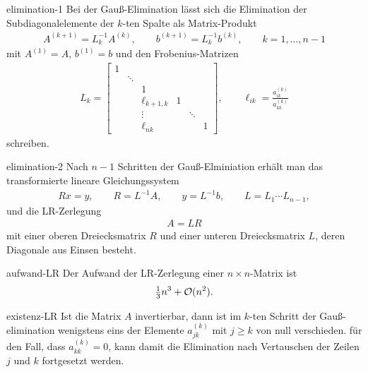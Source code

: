 \begin{Lemma}{elimination-1}
  Bei der Gauß-Elimination lässt sich die Elimination der
  Subdiagonalelemente der $k$-ten Spalte als Matrix-Produkt
  \begin{gather}
    A^{(k+1)} = L^{-1}_k A^{(k)},
    \qquad b^{(k+1)} = L^{-1}_k b^{(k)},
    \qquad k=1,\dots,n-1
  \end{gather}
  mit $A^{(1)}=A$, $b^{(1)}=b$ und den Frobenius-Matrizen
  \begin{gather}
    L_k =\begin{bmatrix}
      1 & & & & & \\
      &\ddots & & & & \\
      &   & 1& & &\\
      &   & \ell_{k+1,k}&1 & &\\
      &   & \vdots& &\ddots &\\
      &   & \ell_{nk}& & &1
    \end{bmatrix},
    \qquad
    \ell_{ik} = \frac{a_{ik}^{(k)}}{a_{kk}^{(k)}}
  \end{gather}
  schreiben.
\end{Lemma}

\begin{Satz}{elimination-2}
  Nach $n-1$ Schritten der Gauß-Elminiation erhält man das transformierte lineare Gleichungssystem
  \begin{gather}
    R x = y,\qquad R = L^{-1}A, \qquad y=L^{-1}b,
    \qquad L = L_1\cdots L_{n-1},
  \end{gather}
  und die LR-Zerlegung
  \begin{gather}
    A = LR
  \end{gather}
  mit einer oberen Dreiecksmatrix $R$ und einer unteren Dreiecksmatrix
  $L$, deren Diagonale aus Einsen besteht.
\end{Satz}

\begin{Lemma}{aufwand-LR}
  Der Aufwand der LR-Zerlegung einer $n\times n$-Matrix ist
  \begin{gather}
    \tfrac13 n^3 + \mathcal O(n^2).
  \end{gather}
\end{Lemma}

\begin{Satz}{existenz-LR}
  Ist die Matrix $A$ invertierbar, dann ist im $k$-ten Schritt der
  Gauß-elimination wenigstens eins der Elemente $a^{(k)}_{jk}$ mit
  $j\ge k$ von null verschieden. für den Fall, dass
  $a^{(k)}_{kk} = 0$, kann damit die Elimination nach Vertauschen der
  Zeilen $j$ und $k$ fortgesetzt werden.
\end{Satz}

